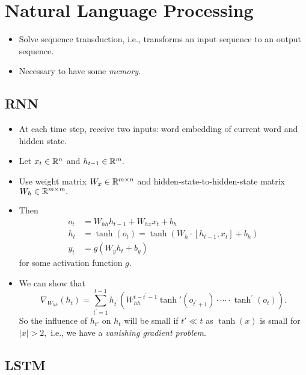 \documentclass[../ds]{subfiles}
\begin{document}
\chapter{Natural Language Processing}

\begin{itemize}
\item 
Solve sequence transduction, i.e., transforms an input sequence to an output sequence.

\item 
Necessary to have some \textit{memory}.
\end{itemize}

\section{RNN}
\begin{itemize}
\item 
At each time step, receive two inputs: word embedding of current word and hidden state.

\item 
Let $x_t \in \mathbb{R}^{n}$ and $h_{t-1} \in \mathbb{R}^{m}.$

\item 
Use weight matrix $W_{x} \in \mathbb{R}^{m \times n}$ and hidden-state-to-hidden-state matrix $W_{h} \in \mathbb{R}^{m\times m}.$

\item 
Then 
\begin{align*}
	o_t &= W_{hh} h_{t-1} + W_{hx} x_t + b_h\\
	h_t &= \tanh(o_t) = \tanh(W_h \cdot [h_{t-1}, x_t] + b_h)\\
	y_t &= g(W_y h_t + b_y)
\end{align*}
for some activation function $g.$

\item 
We can show that 
\[ \nabla_{W_{hh}}(h_t) = \sum_{t^\prime = 1}^{t-1} h_{t^\prime} \left( W_{hh}^{t-t^\prime-1} \tanh'(o_{t^\prime+1}) \cdot \cdots \cdot  \tanh^\prime(o_{t}) \right). \]
So the influence of $h_{t'}$ on $h_{t}$ will be small if $t' \ll t$ as $\tanh(x)$ is small for $|x| > 2,$ i.e., we have a \textit{vanishing gradient problem}.

\end{itemize}

\section{LSTM}
\end{document}

